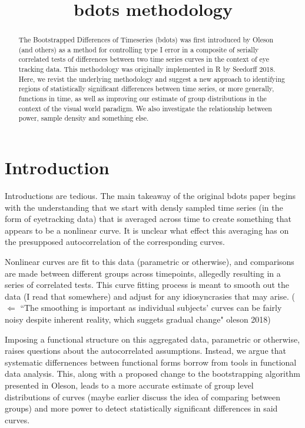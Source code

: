 \documentclass{article}
\title{bdots methodology}
\date{}
\begin{document}

\maketitle

%

\begin{abstract}
The Bootstrapped Differences of Timeseries (bdots) was first introduced by Oleson (and others) as a method for controlling type I error in a composite of serially correlated tests of differences between two time series curves in the context of eye tracking data.  This methodology was originally implemented in R by Seedorff 2018. Here, we revist the underlying methodology and suggest a new approach to identifying regions of statistically significant differences between time series, or more generally, functions in time, as well as improving our estimate of group distributions in the context of the visual world paradigm. We also investigate the relationship between power, sample density and something else. 
\end{abstract}

\section{Introduction}


Introductions are tedious. The main takeaway of the original bdots paper begins with the understanding that we start with densly sampled time series (in the form of eyetracking data) that is averaged across time to create something that appears to be a nonlinear curve. It is unclear what effect this averaging has on the presupposed autocorrelation of the corresponding curves.

Nonlinear curves are fit to this data (parametric or otherwise), and comparisons are made between different groups across timepoints, allegedly resulting in a series of correlated tests. This curve fitting process is meant to smooth out the data (I read that somewhere) and adjust for any idiosyncrasies that may arise. ($\Leftarrow$ ``The smoothing is important as individual subjects' curves can be fairly noisy despite inherent reality, which suggets gradual change" oleson 2018)

Imposing a functional structure on this aggregated data, parametric or otherwise, raises questions about the autocorrelated assumptions. Instead, we argue that systematic differnences between functional forms borrow from tools in functional data analysis. This, along with a proposed change to the bootstrapping algorithm presented in Oleson, leads to a more accurate estimate of group level distributions of curves (maybe earlier discuss the idea of comparing between groups) and more power to detect statistically significant differences in said curves.
\end{document}
